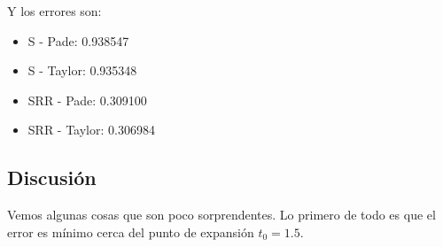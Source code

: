Y los errores son:

\begin{itemize}
\item S - Pade: 0.938547
\item S - Taylor: 0.935348 
\item SRR - Pade: 0.309100 
\item SRR - Taylor: 0.306984 
\end{itemize}

\newpage 

\subsection{Discusión}

Vemos algunas cosas que son poco sorprendentes. Lo primero de todo es que el error es mínimo cerca del punto de expansión $t_0 = 1.5$. 